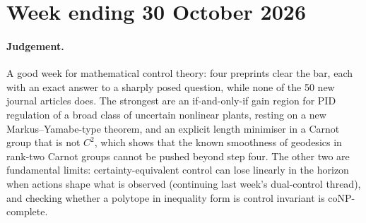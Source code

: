 \documentclass[11pt,a4paper]{article}
\begin{document}
\section{Week ending 30 October 2026}
\label{week:2026-10-30}
\paragraph{Judgement.} A good week for mathematical control theory: four preprints clear the bar, each with an exact answer to a sharply posed question, while none of the 50 new journal articles does. The strongest are an if-and-only-if gain region for \ac{PID} regulation of a broad class of uncertain nonlinear plants, resting on a new Markus--Yamabe-type theorem, and an explicit length minimiser in a Carnot group that is not $C^2$, which shows that the known smoothness of geodesics in rank-two Carnot groups cannot be pushed beyond step four. The other two are fundamental limits: certainty-equivalent control can lose linearly in the horizon when actions shape what is observed (continuing last week's dual-control thread), and checking whether a polytope in inequality form is control invariant is coNP-complete.
\end{document}
